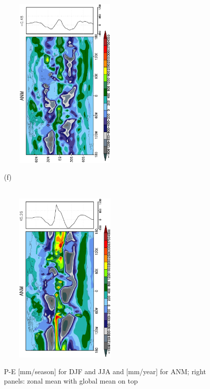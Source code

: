\documentclass[12pt,a4paper,twoside,openright,headinclude,liststotoc,bibtotoc]{scrreprt}
\begin{document}
\begin{figure}[H]
{\includegraphics[height=8.5cm,width=6.5cm,angle=-90]
{eps/zonaltmpluspe.eps}
}
\parbox{8.5cm}{\hspace{0.45cm}\begin{scriptsize}(f)\end{scriptsize} \vspace{-0.7cm} \\
\includegraphics[height=8.5cm,width=6.5cm,angle=-90]
{eps/zonalt21tmfinalpe.eps}
}
\caption[P-E]{P-E [mm/season] for DJF and JJA and [mm/year] for ANM; right panels: zonal mean with global mean on top}
\label{img:pe}
\end{figure}
\end{document}
